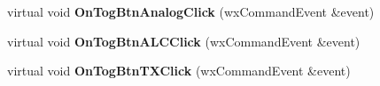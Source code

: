 \begin{DoxyCompactItemize}
\item 
\hypertarget{class_top_frame_ab566e52bc9e8e09bec02fdf5f1ecdaf2}{virtual void {\bfseries On\-Tog\-Btn\-Analog\-Click} (wx\-Command\-Event \&event)}\label{class_top_frame_ab566e52bc9e8e09bec02fdf5f1ecdaf2}

\item 
\hypertarget{class_top_frame_a5ee807cd9f43de8f9cb6c100feab9f22}{virtual void {\bfseries On\-Tog\-Btn\-A\-L\-C\-Click} (wx\-Command\-Event \&event)}\label{class_top_frame_a5ee807cd9f43de8f9cb6c100feab9f22}

\item 
\hypertarget{class_top_frame_a4ecd076a7c6a7c0285b3cdba51d37ace}{virtual void {\bfseries On\-Tog\-Btn\-T\-X\-Click} (wx\-Command\-Event \&event)}\label{class_top_frame_a4ecd076a7c6a7c0285b3cdba51d37ace}

\end{DoxyCompactItemize}
